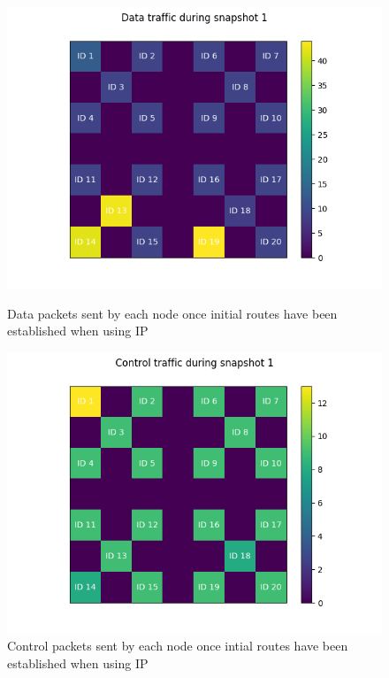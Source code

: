 \documentclass[12pt]{article}
\begin{document}
\begin{figure}[!ht]
    \centering
    \begin{minipage}{0.45\textwidth}
        \centering
        \includegraphics[width=\textwidth]{images/ip/snapshot1-Data.png} %
        \caption{Data packets sent by each node once initial routes have been established when using IP}
        \label{fig:ipdatasnaptwo}
    \end{minipage}\hfill
    \begin{minipage}{0.45\textwidth}
        \centering
       \includegraphics[width=\textwidth]{images/ip/snapshot1-Control.png} %
        \caption{Control packets sent by each node once intial routes have been established when using IP}
        \label{fig:ipctrlsnaptwo}
    \end{minipage}
\end{figure}
\end{document}
